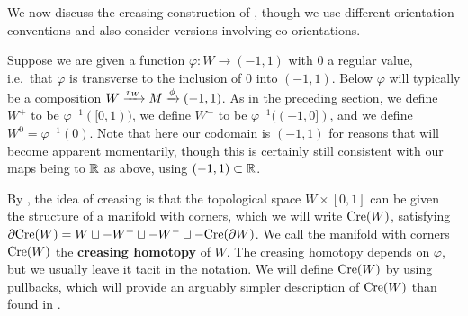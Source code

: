 \begin{comment}
	To make this precise, suppose we are given a function $\varphi \colon W \to (-1,1)$ with $0$ a regular value, i.e.\ that $\varphi$ is transverse to the inclusion of $0$ into $(-1,1)$.
	We define $W^+$ to be $\varphi^{-1}( [0,1))$, we define $W^-$ to be $\varphi^{-1} ((-1, 0])$, and we define $W^0 = \varphi^{-1}(0)$.
	We have already seen this construction in \cref{E: manifold decomposition} and the examples in \cref{S: codim 0 and 1 co-or}, although we here replace the codomain $\R$ with $(-1,1)$ for reasons that will become apparent momentarily.
	Nonetheless, the results of those examples carry over in the obvious way.

	As in those earlier examples, $W^+$, $W^-$, and $W^0$ are manifolds with corners whose inclusions into $W$ are proper maps.
	They are also the fiber products $[0,1)\times_\R W$, $(-1,0] \times_\R W$ and $0 \times_\R W$.
	In those previous examples, we also considered the case of having an intermediary manifold $M$ so that $\varphi$ was a composition $W \xr{r_W} M \xr{\phi} \R$ with $0$ a regular value of both $\phi$ and $\phi r_W$.
	In this case we also observed in \cref{E: manifold decomposition} that $W^0$ and $W^\pm$ are diffeomorphic to the respective fiber products $M^0 \times_M W$ and $M^{\pm} \times_M W$.
	We will need these settings once we have finished with some preliminaries.
\end{comment}

We now discuss the creasing construction of \cite[Section 2.4]{Lipy14}, though we use different orientation conventions and also consider versions involving co-orientations.

Suppose we are given a function $\varphi \colon W \to (-1,1)$ with $0$ a regular value, i.e.\ that $\varphi$ is transverse to the inclusion of $0$ into $(-1,1)$.
Below $\varphi$ will typically be a composition $W \xrightarrow{r_W} M \xrightarrow{\phi} (-1,1)$.
As in the preceding section, we define $W^+$ to be $\varphi^{-1}( [0,1))$, we define $W^-$ to be $\varphi^{-1} ((-1, 0])$, and we define $W^0 = \varphi^{-1}(0)$.
Note that here our codomain is $(-1,1)$ for reasons that will become apparent momentarily, though this is certainly still consistent with our maps being to $\mathbb{R}$ as above, using $(-1,1) \subset \mathbb{R}$.

By \cite[Lemma~9]{Lipy14}, the idea of creasing is that the topological space $W \times [0,1]$ can be given the structure of a manifold with corners, which we will write $\mathrm{Cre}(W)$, satisfying $\partial \mathrm{Cre}(W) = W \sqcup -W^+ \sqcup -W^- \sqcup - \mathrm{Cre}(\partial W)$.
We call the manifold with corners $\mathrm{Cre}(W)$ the \textbf{creasing homotopy} of $W$.
The creasing homotopy depends on $\varphi$, but we usually leave it tacit in the notation.
We will define $\mathrm{Cre}(W)$ by using pullbacks, which will provide an arguably simpler description of $\mathrm{Cre}(W)$ than found in \cite{Lipy14}.

